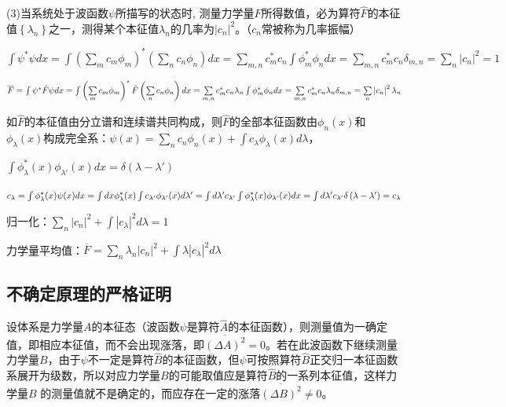 (3)当系统处于波函数$\psi$所描写的状态时,
测量力学量$F$所得数值，必为算符$\hat F$的本征值$\left\{ {\lambda _n
} \right\}$之一，测得某个本征值$\lambda _n $的几率为$\left| {c_n }
\right|^2 $。（$c_n$常被称为几率振幅）

$\int {\psi ^* \psi dx}  = \int {\left( {\sum\limits_m {c_m \phi _m } } \right)^* \left( {\sum\limits_n {c_n \phi _n } } \right)dx}  = \sum\limits_{m,n} {c_m ^* c_n \int {\phi _m ^* \phi _n dx} }  = \sum\limits_{m,n} {c_m ^* c_n \delta _{m,n} }  = \sum\limits_n {\left| {c_n } \right|^2 }  = 1$

$\overline F  = \int {\psi ^* \hat F\psi dx}  = \int {\left(
{\sum\limits_m {c_m \phi _m } } \right)^* \hat F\left(
{\sum\limits_n {c_n \phi _n } } \right)dx}  = \sum\limits_{m,n} {c_m
^* c_n \lambda _n \int {\phi _m ^* \phi _n dx} }\\
 = \sum\limits_{m,n} {c_m ^* c_n \lambda _n \delta _{m,n} }  = \sum\limits_n {\left| {c_n } \right|^2 \lambda _n } $

如$\hat F$的本征值由分立谱和连续谱共同构成，则$\hat F$的全部本征函数由$\phi _n (x)$和$\phi _\lambda  (x)$构成完全系：$\psi (x) = \sum\limits_n {c_n \phi _n (x)}  + \int {c_\lambda  \phi _\lambda  (x)d\lambda } $，

$\int {\phi _\lambda  ^* (x)\phi _{\lambda '} (x)dx}  = \delta \left( {\lambda  - \lambda '} \right)$



$c_\lambda   = \int {\phi _\lambda  ^* (x)\psi (x)dx}
  = \int {dx\phi _\lambda  ^* (x)\int {c_{\lambda '} \phi _{\lambda '} (x)d\lambda '} }  = \int {d\lambda 'c_{\lambda '} \int {\phi _\lambda  ^* (x)} } \phi _{\lambda '}
  (x)dx\\
  = \int {d\lambda 'c_{\lambda '} \delta \left( {\lambda  - \lambda '} \right)}  = c_\lambda$

归一化：$\sum\limits_n {\left| {c_n } \right|^2 }  + \int {\left| {c_\lambda  } \right|^2 d\lambda }  = 1$


力学量平均值：$\overline F  = \sum\limits_n {\lambda _n \left| {c_n } \right|^2 }  + \int {\lambda \left| {c_\lambda  } \right|^2 d\lambda } $


\subsection{不确定原理的严格证明}


设体系是力学量$A$的本征态（波函数$\psi$是算符$\hat A$的本征函数），则测量值为一确定值，即相应本征值，而不会出现涨落，即$\overline {\left( {\Delta A} \right)^2 }  = 0$。若在此波函数下继续测量力学量$B$，由于$\psi$不一定是算符$\hat B$的本征函数，但$\psi$可按照算符$\hat B$正交归一本征函数系展开为级数，所以对应力学量$B$的可能取值应是算符$\hat B$的一系列本征值，这样力学量$B$ 的测量值就不是确定的，而应存在一定的涨落$\overline {\left( {\Delta B} \right)^2 }  \ne 0$。

